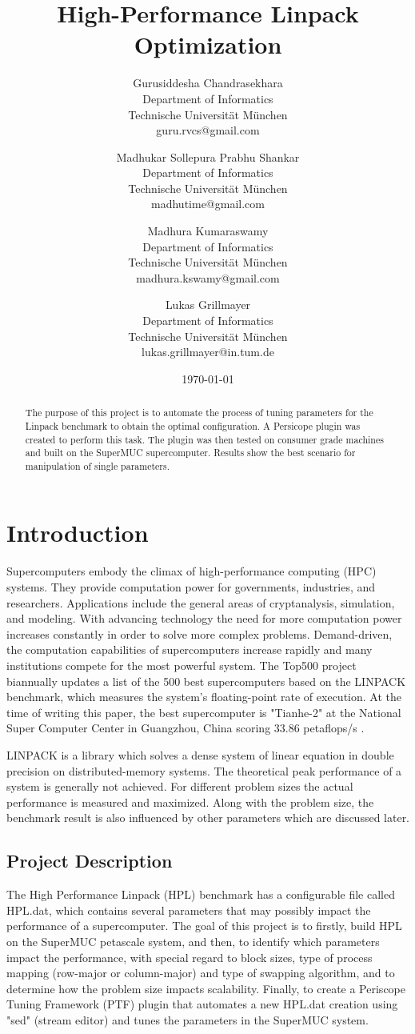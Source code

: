 \documentclass[10pt,twocolumn]{article}
\title{High-Performance Linpack Optimization}
\author{
    Gurusiddesha Chandrasekhara\\
    Department of Informatics\\
    Technische Universit\"at M\"unchen\\
    guru.rvcs@gmail.com
  	\and
    Madhukar Sollepura Prabhu Shankar\\
    Department of Informatics\\
    Technische Universit\"at M\"unchen\\
    madhutime@gmail.com
    \and
    Madhura 	Kumaraswamy\\
    Department of Informatics\\
    Technische Universit\"at M\"unchen\\
    madhura.kswamy@gmail.com
    \and
    Lukas Grillmayer\\
    Department of Informatics\\
    Technische Universit\"at M\"unchen\\
    lukas.grillmayer@in.tum.de
}
\date{\today}
\begin{document}
\maketitle

\begin{abstract}
The purpose of this project is to automate the process of tuning parameters for the Linpack benchmark to obtain the optimal configuration. A Persicope plugin was created to perform this task. The plugin was then tested on consumer grade machines and built on the SuperMUC supercomputer. Results show the best scenario for manipulation of single parameters.
\end{abstract}

\section{Introduction}
\label{sec:introduction}
Supercomputers embody the climax of high-performance computing (HPC) systems. They provide computation power for governments, industries, and researchers. Applications include the general areas of cryptanalysis, simulation, and modeling. With advancing technology the need for more computation power increases constantly in order to solve more complex problems. Demand-driven, the computation capabilities of supercomputers increase rapidly and many institutions compete for the most powerful system. The Top500 project biannually updates a list of the 500 best supercomputers based on the LINPACK benchmark, which measures the system's floating-point rate of execution. At the time of writing this paper, the best supercomputer is "Tianhe-2" at the National Super Computer Center in Guangzhou, China scoring 33.86 petaflops/s \cite{top500}.

LINPACK is a library which solves a dense system of linear equation in double precision on distributed-memory systems. The theoretical peak performance of a system is generally not achieved. For different problem sizes the actual performance is measured and maximized. Along with the problem size, the benchmark result is also influenced by other parameters which are discussed later.

\subsection{Project Description}
The High Performance Linpack (HPL) benchmark has a configurable file called HPL.dat, which contains several parameters that may possibly impact the performance of a supercomputer. The goal of this project is to firstly, build HPL on the SuperMUC petascale system, and then, to identify which parameters impact the performance, with special regard to block sizes, type of process mapping (row-major or column-major) and type of swapping algorithm, and to determine how the problem size impacts scalability. Finally, to create a Periscope Tuning Framework (PTF) plugin that automates a new HPL.dat creation using "sed" (stream editor) and tunes the parameters in the SuperMUC system.
\end{document}
